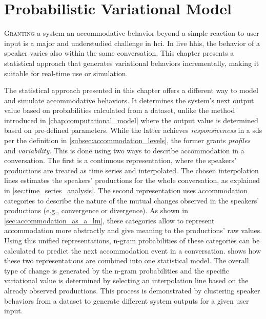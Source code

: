 \chapter{Probabilistic Variational Model}
\label{chap:statistical_model}

\lettrine{G}{ranting} a system an accommodative behavior beyond a simple reaction to user input is a major and understudied challenge in \acs{hci}.
In live \acsp{hhi}, the behavior of a speaker varies also within the same conversation.
This chapter presents a statistical approach that generates variational behaviors incrementally, making it suitable for real-time use or simulation.

\pagebreak

\noindent
The statistical approach presented in this chapter offers a different way to model and simulate accommodative behaviors.
It determines the system's next output value based on probabilities calculated from a dataset, unlike the method introduced in \cref{chap:computational_model} where the output value is determined based on pre-defined parameters.
While the latter achieves \emph{responsiveness} in a \ac{sds} per the definition in \cref{subsec:accommodation_levels}, the former grants \emph{profiles} and \emph{variability}.
This is done using two ways to describe accommodation in a conversation.
The first is a continuous representation, where the speakers' productions are treated as time series and interpolated.
The chosen interpolation lines estimates the speakers' productions for the whole conversation, as explained in \cref{sec:time_series_analysis}.
The second representation uses accommodation categories to describe the nature of the mutual changes observed in the speakers' productions (e.g., convergence or divergence).
As shown in \cref{sec:accommodation_as_a_lm}, these categories allow to represent accommodation more abstractly and give meaning to the productions' raw values.
Using this unified representations, n-gram probabilities of these categories can be calculated to predict the next accommodation event in a conversation.
 shows how these two representations are combined into one statistical model.
The overall type of change is generated by the n-gram probabilities and the specific variational value is determined by selecting an interpolation line based on the already observed productions.
This process is demonstrated by clustering speaker behaviors from a dataset to generate different system outputs for a given user input.

